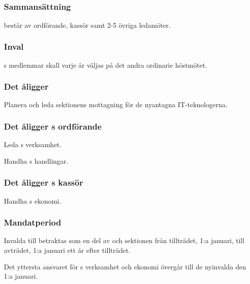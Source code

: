 \subsection{\NOLLKITFULL}
\subsubsection{Sammansättning}
\NOLLKIT{} består av ordförande, kassör samt 2-5 övriga ledamöter.

\subsubsection{Inval}
\NOLLKIT{}s medlemmar skall varje år väljas på det andra ordinarie höstmötet.

\subsubsection{Det åligger \NOLLKIT}
\begin{att}
	\item Planera och leda sektionens mottagning för de nyantagna IT-teknologerna.
\end{att}

\subsubsection{Det åligger \NOLLKIT{}s ordförande}
\begin{att}
	\item Leda \NOLLKIT{}s verksamhet.
	\item Handha \NOLLKIT{}s handlingar.
\end{att}

\subsubsection{Det åligger \NOLLKIT{}s kassör}
\begin{att}
	\item Handha \NOLLKIT{}s ekonomi.
\end{att}

\subsubsection{Mandatperiod}
Invalda till \NOLLKIT{} betraktas som en del av \NOLLKIT{} och sektionen från tillträdet, 1:a januari, till avträdet, 1:a januari ett år efter tillträdet.

Det yttersta ansvaret för \NOLLKIT{} s verksamhet och ekonomi övergår till de nyinvalda den 1:a januari.